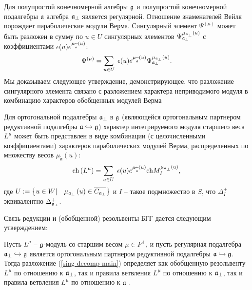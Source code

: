 \documentclass[14pt,autoref,href,facsimile
]{disser}
\begin{document}
Для полупростой конечномерной алгебры $\mathfrak{g}$  и полупростой конечномерной подалгебры $\mathfrak{a}$ алгебра $\mathfrak{a}_{\perp}$ является регулярной. Отношение знаменателей Вейля порождает параболические модули Верма. Сингулярный элемент  $\Psi ^{\left( \mu \right) }$ может быть разложен в сумму по  $u\in U$  сингулярных элементов $\Psi _{\mathfrak{a}_{\perp}}^{\mu _{\mathfrak{a}_{\perp}}\left( u\right) }$ с коэффициентами
$\epsilon (u)e^{\mu _{\widetilde{\mathfrak{a}}}\left( u\right) }$:
\begin{equation}
\Psi ^{\left( \mu \right) }=\sum_{u\in U}\;\epsilon (u)e^{\mu _{\widetilde{%
\mathfrak{a}}}\left( u\right) }\Psi _{\frak{a}_{\perp }}^{\mu _{\frak{a}%
_{\perp }}\left( u\right) }.  \label{sing decomp main}
\end{equation}
Мы доказываем следующее утверждение, демонстрирующее, что разложение сингулярного элемента связано с разложением характера неприводимого модуля в комбинацию характеров обобщенных модулей Верма
\vspace{-0.3cm}
\begin{statement}
Для ортогональной подалгебры  $\frak{a}_{\perp }$ в $\frak{g}$ (являющейся ортогональным партнером редуктивной подалгебры $\frak{a}\hookrightarrow \frak{g}$) характер интегрируемого модуля старшего веса  $L^{\mu }$ может быть представлен в виде комбинации (с целочисленными коэффициентами) характеров параболических модулей Верма, распределенных по множеству весов $\mu _{\widetilde{\mathfrak{a}}}\left(
u\right)$:
\begin{equation}
\mathrm{ch}\left( L^{\mu }\right) =\sum_{u\in U}\;\epsilon (u)e^{\mu _{%
\widetilde{\frak{a}}}\left( u\right) }\mathrm{ch}M_{I}^{\mu _{\frak{a}%
_{\perp }}\left( u\right) },  \label{gen Weyl-Verma}
\end{equation}
где  $U:=\left\{ u\in W|\quad \mu _{\frak{a}_{\perp }}\left( u\right) \in
\overline{C_{\frak{a}_{\perp }}}\right\} $ и $I$ -- такое подмножество в  $S$, что $\Delta _{I}^{+}$ эквивалентно $\Delta _{\frak{a}_{\perp }}^{+}$.
\end{statement}
\vspace{-0.3cm}
Связь редукции и (обобщенной) резольвенты БГГ дается следующим утверждением:
\vspace{-0.3cm}
\begin{statement}
Пусть $L^{\mu }$ --  $\frak{g}$-модуль со старшим весом $\mu \in P^{+}$, и пусть регулярная подалгебра  $\mathfrak{a}_{\perp}\hookrightarrow \frak{g}$ является ортогональным партнером редуктивной подалгебры $\frak{a}\hookrightarrow \frak{g}$. Тогда разложение (\ref{sing decomp main}) определяет как обобщенную резольвенту $L^{\mu }$ по отношению к $\mathfrak{a}_{\perp}$, так и правила ветвления $L^{\mu }$ по отношению к $\mathfrak{a}_{\perp}$, так и правила ветвления $L^{\mu }$ по отношению к $\mathfrak{a}$ .
\end{statement}
\end{document}
